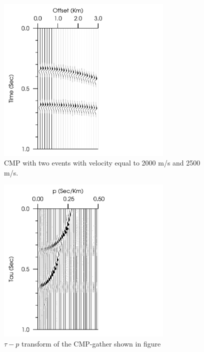 \documentclass[xcolor=dvipsnames,notes]{beamer}
\begin{document}
\begin{frame}
\begin{figure}
\includegraphics[width=0.75\textwidth]{Fig/fig-5-shot.pdf}
\caption{CMP with two events with velocity equal to 2000 m/s and 2500 m/s.}
\label{fig-5-shot}
\end{figure}
\end{frame}
\begin{frame}
\begin{figure}
\includegraphics[width=0.75\textwidth]{Fig/fig-5-taup.pdf}
\caption{$\tau-p$ transform of the CMP-gather shown in figure \protect{\ref{fig-5-shot}}}
\end{figure}
\end{frame}
\end{document}
